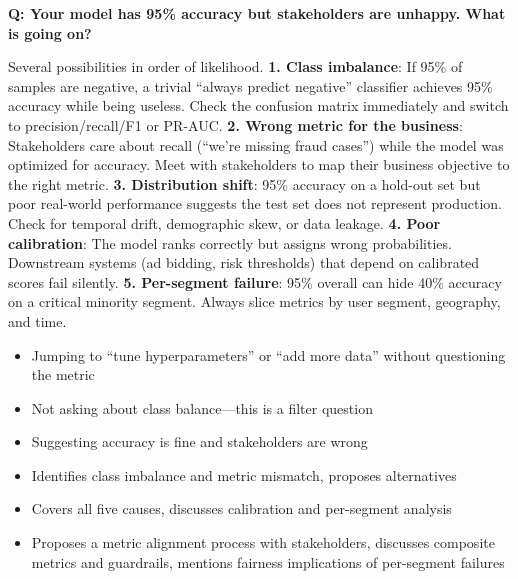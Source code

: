 \begin{interviewq}
\textbf{Q: Your model has 95\% accuracy but stakeholders are unhappy. What is going on?}

 \quad {} \quad \badgefreq{\freqhigh}

\stronganswer Several possibilities in order of likelihood. \textbf{1. Class imbalance}: If 95\% of samples are negative, a trivial ``always predict negative'' classifier achieves 95\% accuracy while being useless. Check the confusion matrix immediately and switch to precision/recall/F1 or PR-AUC. \textbf{2. Wrong metric for the business}: Stakeholders care about recall (``we're missing fraud cases'') while the model was optimized for accuracy. Meet with stakeholders to map their business objective to the right metric. \textbf{3. Distribution shift}: 95\% accuracy on a hold-out set but poor real-world performance suggests the test set does not represent production. Check for temporal drift, demographic skew, or data leakage. \textbf{4. Poor calibration}: The model ranks correctly but assigns wrong probabilities. Downstream systems (ad bidding, risk thresholds) that depend on calibrated scores fail silently. \textbf{5. Per-segment failure}: 95\% overall can hide 40\% accuracy on a critical minority segment. Always slice metrics by user segment, geography, and time.

\redflags
\begin{itemize}
    \item Jumping to ``tune hyperparameters'' or ``add more data'' without questioning the metric
    \item Not asking about class balance---this is a filter question
    \item Suggesting accuracy is fine and stakeholders are wrong
\end{itemize}


\goodgreat
\begin{itemize}
    \item {} Identifies class imbalance and metric mismatch, proposes alternatives
    \item {} Covers all five causes, discusses calibration and per-segment analysis
    \item {} Proposes a metric alignment process with stakeholders, discusses composite metrics and guardrails, mentions fairness implications of per-segment failures
\end{itemize}

\end{interviewq}


